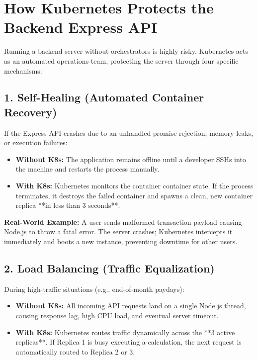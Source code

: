 \documentclass[11pt,a4paper]{article}
\begin{document}
\vspace{0.5cm}

\section{How Kubernetes Protects the Backend Express API}

Running a backend server without orchestrators is highly risky. Kubernetes acts as an automated operations team, protecting the server through four specific mechanisms:

\subsection{1. Self-Healing (Automated Container Recovery)}
If the Express API crashes due to an unhandled promise rejection, memory leaks, or execution failures:
\begin{itemize}
    \item \textbf{Without K8s:} The application remains offline until a developer SSHs into the machine and restarts the process manually.
    \item \textbf{With K8s:} Kubernetes monitors the container container state. If the process terminates, it destroys the failed container and spawns a clean, new container replica **in less than 3 seconds**.
\end{itemize}
\textbf{Real-World Example:} A user sends malformed transaction payload causing Node.js to throw a fatal error. The server crashes; Kubernetes intercepts it immediately and boots a new instance, preventing downtime for other users.

\subsection{2. Load Balancing (Traffic Equalization)}
During high-traffic situations (e.g., end-of-month paydays):
\begin{itemize}
    \item \textbf{Without K8s:} All incoming API requests land on a single Node.js thread, causing response lag, high CPU load, and eventual server timeout.
    \item \textbf{With K8s:} Kubernetes routes traffic dynamically across the **3 active replicas**. If Replica 1 is busy executing a calculation, the next request is automatically routed to Replica 2 or 3.
\end{itemize}
\end{document}
